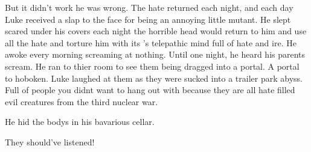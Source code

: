 But it didn't work he was wrong. The hate returned each night, and
each day Luke received a slap to the face for being an annoying
little mutant. He slept scared under his covers each night the
horrible head would return to him and use all the hate and torture
him with its 's telepathic mind full of hate and ire. He awoke
every morning screaming at nothing. Until one night, he heard his
parents scream. He ran to thier room to see them being dragged into
a portal. A portal to hoboken. Luke laughed at them as they were
sucked into a trailer park abyss. Full of people you didnt want to
hang out with because they are all hate filled evil creatures from
the third nuclear war.



He hid the bodys in his bavarious cellar.



They should've listened! 
 



